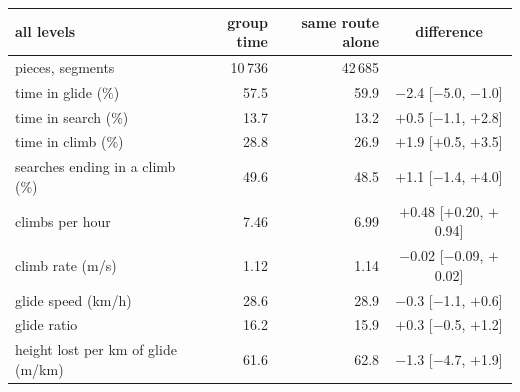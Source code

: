 \begin{tabular}{@{}l r r c@{}}
\toprule
all levels & group time & same route alone & difference \\
\midrule
pieces, segments & 10\,736 & 42\,685 & \\
time in glide (\%) & 57.5 & 59.9 & $-$2.4 [$-$5.0, $-$1.0] \\
time in search (\%) & 13.7 & 13.2 & $+$0.5 [$-$1.1, $+$2.8] \\
time in climb (\%) & 28.8 & 26.9 & $+$1.9 [$+$0.5, $+$3.5] \\
searches ending in a climb (\%) & 49.6 & 48.5 & $+$1.1 [$-$1.4, $+$4.0] \\
climbs per hour & 7.46 & 6.99 & $+$0.48 [$+$0.20, $+$0.94] \\
climb rate (m/s) & 1.12 & 1.14 & $-$0.02 [$-$0.09, $+$0.02] \\
glide speed (km/h) & 28.6 & 28.9 & $-$0.3 [$-$1.1, $+$0.6] \\
glide ratio & 16.2 & 15.9 & $+$0.3 [$-$0.5, $+$1.2] \\
height lost per km of glide (m/km) & 61.6 & 62.8 & $-$1.3 [$-$4.7, $+$1.9] \\
\bottomrule
\end{tabular}

